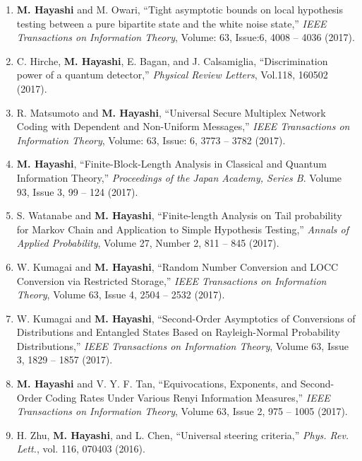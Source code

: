 \documentclass[a4paper,12pt,oneside]{article}
\begin{document}
\begin{enumerate}
\item
\textbf{M. Hayashi} and M. Owari, 
``Tight asymptotic bounds on local hypothesis testing between a pure bipartite state and the white noise state,'' 
{\em IEEE Transactions on Information Theory}, 
Volume: 63, Issue:6, 4008 -- 4036 (2017). 

\item
C. Hirche, \textbf{M. Hayashi}, E. Bagan, and J. Calsamiglia, 
``Discrimination power of a quantum detector,'' 
{\em Physical Review Letters}, Vol.118, 160502 (2017). 

\item
R. Matsumoto and \textbf{M. Hayashi},  
``Universal Secure Multiplex Network Coding with Dependent and Non-Uniform Messages,'' 
{\em IEEE Transactions on Information Theory}, Volume: 63, Issue: 6, 3773 -- 3782 (2017). 

\item 
\textbf{M. Hayashi}, ``Finite-Block-Length Analysis in Classical and Quantum Information Theory,'' 
{\em Proceedings of the Japan Academy, Series B}.
Volume 93, Issue 3, 99 -- 124 (2017).

\item 
S. Watanabe and \textbf{M. Hayashi}, ``Finite-length Analysis on Tail probability for Markov Chain and Application to Simple Hypothesis Testing,'' 
{\em Annals of Applied Probability},
Volume 27, Number 2, 811 -- 845 (2017).

\item 
W. Kumagai and \textbf{M. Hayashi}, ``Random Number Conversion and LOCC Conversion via Restricted Storage,'' 
{\em IEEE Transactions on Information Theory},
Volume 63, Issue 4, 2504 -- 2532 (2017). 

\item 
W. Kumagai and \textbf{M. Hayashi}, ``Second-Order Asymptotics of Conversions of Distributions and Entangled States Based on Rayleigh-Normal Probability Distributions,'' 
{\em IEEE Transactions on Information Theory}, Volume 63, Issue 3, 1829 -- 1857 (2017). 

\item 
\textbf{M. Hayashi} and V. Y. F. Tan, ``Equivocations, Exponents, and Second-Order Coding Rates Under Various Renyi Information Measures,'' 
{\em IEEE Transactions on Information Theory}, Volume 63, Issue 2, 975 -- 1005 (2017). 

\item 
H. Zhu, \textbf{M. Hayashi}, and L. Chen, ``Universal steering criteria,'' 
{\em Phys. Rev. Lett.}, vol. 116, 070403 (2016). 


\end{enumerate}
\end{document}

